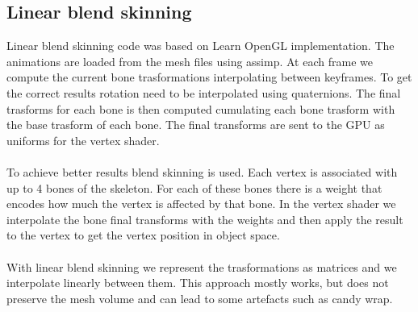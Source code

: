 \documentclass[12pt, a4paper]{article}
\begin{document}
\subsection{Linear blend skinning}
Linear blend skinning code was based on Learn OpenGL implementation. The animations are loaded from the mesh files using assimp.
At each frame we compute the current bone trasformations interpolating between keyframes. To get the correct results rotation
need to be interpolated using quaternions. The final trasforms for each bone is then computed cumulating each bone trasform with the base
trasform of each bone. The final transforms are sent to the GPU as uniforms for the vertex shader.\\\\
To achieve better results blend skinning is used. Each vertex is associated with up to 4 bones
of the skeleton. For each of these bones there is a weight that encodes how much the vertex is affected by that bone.
In the vertex shader we interpolate the bone final transforms with the weights and then apply the result to the vertex to get
the vertex position in object space.\\\\
With linear blend skinning we represent the trasformations as matrices and we interpolate linearly between them.
This approach mostly works, but does not preserve the mesh volume and can lead to some artefacts such as candy wrap.
\end{document}
